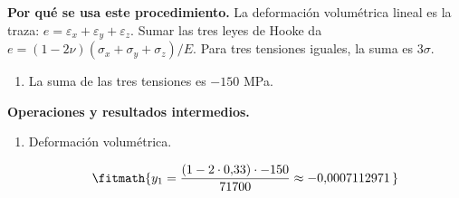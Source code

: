 \noindent\textbf{Por qué se usa este procedimiento.} La deformación volumétrica lineal es la traza: $e=\varepsilon_x+\varepsilon_y+\varepsilon_z$. Sumar las tres leyes de Hooke da $e=(1-2\nu)(\sigma_x+\sigma_y+\sigma_z)/E$. Para tres tensiones iguales, la suma es $3\sigma$.

\begin{enumerate}

\item La suma de las tres tensiones es $-150$ MPa.

\end{enumerate}

\noindent\textbf{Operaciones y resultados intermedios.}

\begin{enumerate}

\item Deformación volumétrica.

\[\fitmath{y_{1}=\frac{\left(1-2\cdot 0{,}33\right)\cdot -150}{71700}\approx -0{,}0007112971\,}\]

\end{enumerate}
